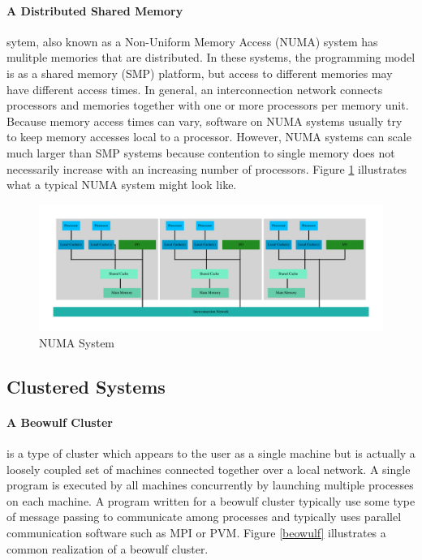 \documentclass[11pt]{book}
\begin{document}
\paragraph{A Distributed Shared Memory} sytem, also known as a Non-Uniform Memory Access
(NUMA) system has mulitple memories that are distributed.  In these systems, the programming model
is as a shared memory (SMP) platform, but access to different memories may have different access
times.  In general, an interconnection network connects processors and memories together with one or
more processors per memory unit.  Because memory access times can vary, software on NUMA systems
usually try to keep memory accesses local to a processor.  However, NUMA systems can scale much
larger than SMP systems because contention to single memory does not necessarily increase with an
increasing number of processors.  Figure \ref{distributed} illustrates what a typical NUMA system
might look like.

\begin{figure}
  \centering
  \includegraphics[width=\textwidth,quiet]{figs/graphviz/distributed.pdf}
  \caption{NUMA System}\label{distributed}
\end{figure}

\subsection{Clustered Systems}

\paragraph{A Beowulf Cluster} is a type of cluster which appears to the user as a single
machine but is actually a loosely coupled set of machines connected together over a local network.
A single program is executed by all machines concurrently by launching multiple processes on each
machine.  A program written for a beowulf cluster typically use some type of message passing to
communicate among processes and typically uses parallel communication software such as MPI or PVM.
Figure \ref{beowulf} illustrates a common realization of a beowulf cluster.
\end{document}
